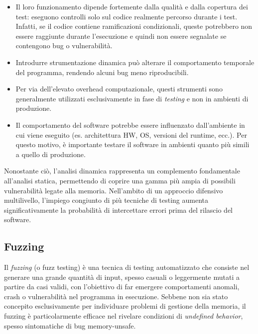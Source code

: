 \begin{itemize}
  \item Il loro funzionamento dipende fortemente dalla qualità e dalla copertura
    dei test: eseguono controlli solo sul codice realmente percorso durante i
    test. Infatti, se il codice contiene ramificazioni condizionali, queste potrebbero
    non essere raggiunte durante l'esecuzione e quindi non essere segnalate se contengono
    bug o vulnerabilità.

  \item Introdurre strumentazione dinamica può alterare il comportamento temporale
    del programma, rendendo alcuni bug meno riproducibili.

  \item Per via dell'elevato overhead computazionale, questi strumenti sono
    generalmente utilizzati esclusivamente in fase di \textit{testing} e non in ambienti
    di produzione.

  \item Il comportamento del software potrebbe essere influenzato dall'ambiente in
    cui viene eseguito (es. architettura HW, OS, versioni del runtime, ecc.). Per questo motivo, è
    importante testare il software in ambienti quanto più simili a quello di produzione.
\end{itemize}

Nonostante ciò, l'analisi dinamica rappresenta un complemento fondamentale all'analisi
statica, permettendo di coprire una gamma più ampia di possibili vulnerabilità legate
alla memoria. Nell'ambito di un approccio difensivo multilivello, l'impiego congiunto
di più tecniche di testing aumenta significativamente la probabilità di intercettare
errori prima del rilascio del software.

\subsection{Fuzzing}
\label{sec:fuzzing}

Il \textit{fuzzing} (o fuzz testing) è una tecnica di testing automatizzato che consiste
nel generare una grande quantità di input, spesso casuali o leggermente mutati a
partire da casi validi, con l'obiettivo di far emergere comportamenti anomali,
crash o vulnerabilità nel programma in esecuzione. Sebbene non sia stato concepito
esclusivamente per individuare problemi di gestione della memoria, il fuzzing è
particolarmente efficace nel rivelare condizioni di \textit{undefined behavior},
spesso sintomatiche di bug memory-unsafe.


